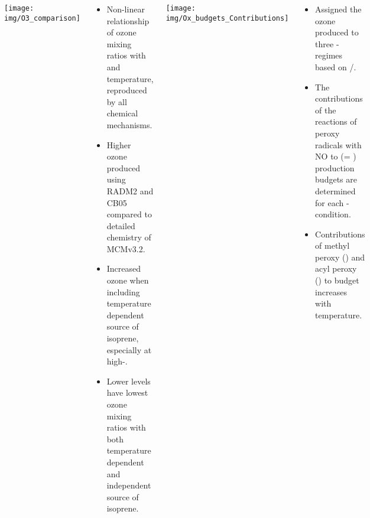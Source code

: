 \begin{GreyBox}
    \vskip-1cm
    \begin{block}{} 
        
        \begin{columns}[c]
                \texttt{[image: img/O3\_comparison]}
                \vskip3cm
                \begin{WhiteBox}
                    \begin{itemize} \vspace{3mm}
                        \item Non-linear relationship of ozone mixing ratios with  and temperature, reproduced by all chemical mechanisms. \vspace{9mm}
                        \item Higher ozone produced using RADM2 and CB05 compared to detailed chemistry of MCMv3.2. \vspace{9mm}
                        \item Increased ozone when including temperature dependent source of isoprene, especially at high-. \vspace{9mm}
                        \item Lower  levels have lowest ozone mixing ratios with both temperature dependent and independent source of isoprene. \vspace{9mm}
                    \end{itemize}
                \end{WhiteBox}
                \texttt{[image: img/Ox\_budgets\_Contributions]}
                \vskip3cm
                \begin{WhiteBox} \vspace{3mm}
                    \begin{itemize}
                        \item Assigned the ozone produced to three -regimes based on /. \vspace{9mm}
                        \item The contributions of the reactions of peroxy radicals with NO to  (= ) production budgets are determined for each -condition.\vspace{9mm}
                        \item Contributions of methyl peroxy () and acyl peroxy () to  budget increases with temperature.\vspace{9mm}

\end{itemize}
\end{WhiteBox}
\end{columns}
\end{block}
\end{GreyBox}
